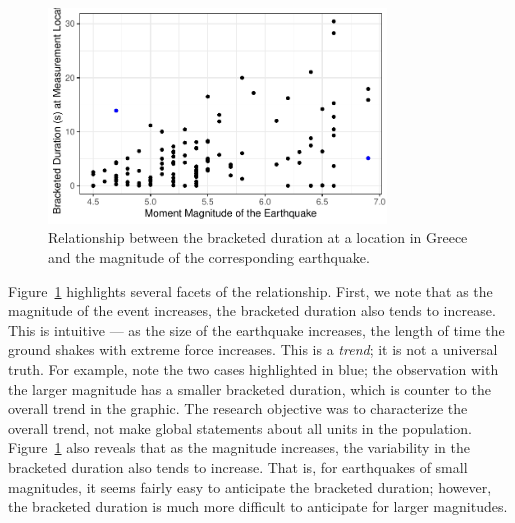 \documentclass[
  letterpaper,
  DIV=11,
  numbers=noendperiod]{scrreprt}
\theoremstyle{definition}
\theoremstyle{definition}
\theoremstyle{plain}
\theoremstyle{remark}
\begin{document}
\begin{figure}

{\centering \includegraphics[width=0.8\textwidth,height=\textheight]{./images/fig-regsummaries-magnitude-1.pdf}

}

\caption{\label{fig-regsummaries-magnitude}Relationship between the
bracketed duration at a location in Greece and the magnitude of the
corresponding earthquake.}

\end{figure}

Figure~\ref{fig-regsummaries-magnitude} highlights several facets of the
relationship. First, we note that as the magnitude of the event
increases, the bracketed duration also tends to increase. This is
intuitive --- as the size of the earthquake increases, the length of
time the ground shakes with extreme force increases. This is a
\emph{trend}; it is not a universal truth. For example, note the two
cases highlighted in blue; the observation with the larger magnitude has
a smaller bracketed duration, which is counter to the overall trend in
the graphic. The research objective was to characterize the overall
trend, not make global statements about all units in the population.
Figure~\ref{fig-regsummaries-magnitude} also reveals that as the
magnitude increases, the variability in the bracketed duration also
tends to increase. That is, for earthquakes of small magnitudes, it
seems fairly easy to anticipate the bracketed duration; however, the
bracketed duration is much more difficult to anticipate for larger
magnitudes.
\end{document}
